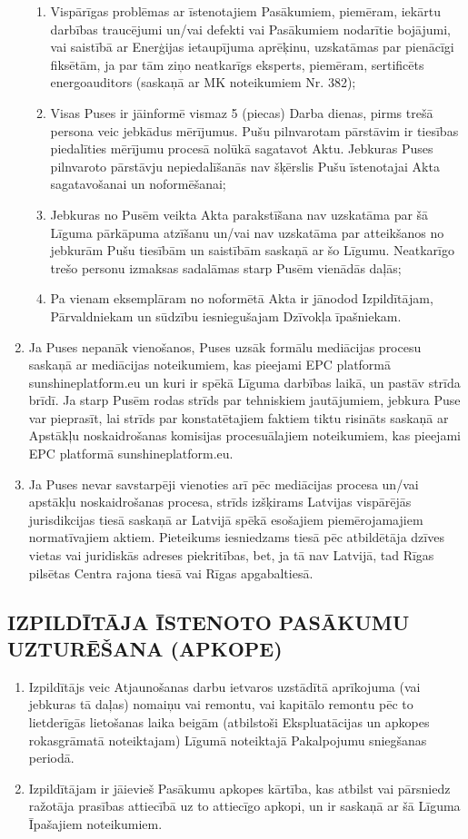 \begin{multicols}{2}
\begin{enumerate}
\begin{enumerate}
		\item Vispārīgas problēmas ar īstenotajiem Pasākumiem, piemēram, iekārtu darbības traucējumi un/vai defekti vai Pasākumiem nodarītie bojājumi, vai saistībā ar Enerģijas ietaupījuma aprēķinu, uzskatāmas par pienācīgi fiksētām, ja par tām ziņo neatkarīgs eksperts, piemēram, sertificēts energoauditors (saskaņā ar MK noteikumiem Nr. 382);
		\item Visas Puses ir jāinformē vismaz 5 (piecas) Darba dienas, pirms trešā persona veic jebkādus mērījumus. Pušu pilnvarotam pārstāvim ir tiesības piedalīties mērījumu procesā nolūkā sagatavot Aktu. Jebkuras Puses pilnvaroto pārstāvju nepiedalīšanās nav šķērslis Pušu īstenotajai Akta sagatavošanai un noformēšanai;
		\item Jebkuras no Pusēm veikta Akta parakstīšana nav uzskatāma par šā Līguma pārkāpuma atzīšanu un/vai nav uzskatāma par atteikšanos no jebkurām Pušu tiesībām un saistībām saskaņā ar šo Līgumu. Neatkarīgo trešo personu izmaksas sadalāmas starp Pusēm vienādās daļās;
		\item Pa vienam eksemplāram no noformētā Akta ir jānodod Izpildītājam, Pārvaldniekam un sūdzību iesniegušajam Dzīvokļa īpašniekam.
	\end{enumerate}
	\item Ja Puses nepanāk vienošanos, Puses uzsāk formālu mediācijas procesu saskaņā ar mediācijas noteikumiem, kas pieejami EPC platformā sunshineplatform.eu un kuri ir spēkā Līguma darbības laikā, un pastāv strīda brīdī. Ja starp Pusēm rodas strīds par tehniskiem jautājumiem, jebkura Puse var pieprasīt, lai strīds par konstatētajiem faktiem tiktu risināts saskaņā ar Apstākļu noskaidrošanas komisijas procesuālajiem noteikumiem, kas pieejami EPC platformā sunshineplatform.eu.
	\item Ja Puses nevar savstarpēji vienoties arī pēc mediācijas procesa un/vai apstākļu noskaidrošanas procesa, strīds izšķirams Latvijas vispārējās jurisdikcijas tiesā saskaņā ar Latvijā spēkā esošajiem piemērojamajiem normatīvajiem aktiem. Pieteikums iesniedzams tiesā pēc atbildētāja dzīves vietas vai juridiskās adreses piekritības, bet, ja tā nav Latvijā, tad Rīgas pilsētas Centra rajona tiesā vai Rīgas apgabaltiesā.
\end{enumerate}

\subsection{IZPILDĪTĀJA ĪSTENOTO PASĀKUMU UZTURĒŠANA (APKOPE)}
\begin{enumerate}
	\item Izpildītājs veic Atjaunošanas darbu ietvaros uzstādītā aprīkojuma (vai jebkuras tā daļas) nomaiņu vai remontu, vai kapitālo remontu pēc to lietderīgās lietošanas laika beigām (atbilstoši Ekspluatācijas un apkopes rokasgrāmatā noteiktajam) Līgumā noteiktajā Pakalpojumu sniegšanas periodā.
	\item Izpildītājam ir jāievieš Pasākumu apkopes kārtība, kas atbilst vai pārsniedz ražotāja prasības attiecībā uz to attiecīgo apkopi, un ir saskaņā ar šā Līguma Īpašajiem noteikumiem.
\end{enumerate}


\end{multicols}
